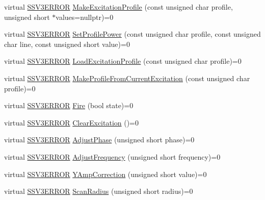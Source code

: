 \begin{DoxyCompactItemize}
\item 
virtual \hyperlink{classSSV3_1_1Controller_a8ff24a92ec373aa1257dcfe2aa2e5406}{S\-S\-V3\-E\-R\-R\-O\-R} \hyperlink{classSSV3_1_1Controller_ab487017fe12dd264eb13ed5a22ea5234}{Make\-Excitation\-Profile} (const unsigned char profile, unsigned short $\ast$values=nullptr)=0
\item 
virtual \hyperlink{classSSV3_1_1Controller_a8ff24a92ec373aa1257dcfe2aa2e5406}{S\-S\-V3\-E\-R\-R\-O\-R} \hyperlink{classSSV3_1_1Controller_a86dec212a202c8fae4eed2ab5251075d}{Set\-Profile\-Power} (const unsigned char profile, const unsigned char line, const unsigned short value)=0
\item 
virtual \hyperlink{classSSV3_1_1Controller_a8ff24a92ec373aa1257dcfe2aa2e5406}{S\-S\-V3\-E\-R\-R\-O\-R} \hyperlink{classSSV3_1_1Controller_a556fcce5eaf8e0858b5eb05d305ec2d8}{Load\-Excitation\-Profile} (const unsigned char profile)=0
\item 
virtual \hyperlink{classSSV3_1_1Controller_a8ff24a92ec373aa1257dcfe2aa2e5406}{S\-S\-V3\-E\-R\-R\-O\-R} \hyperlink{classSSV3_1_1Controller_a9de63a8ca846a49c3a7d4e988f887d73}{Make\-Profile\-From\-Current\-Excitation} (const unsigned char profile)=0
\item 
virtual \hyperlink{classSSV3_1_1Controller_a8ff24a92ec373aa1257dcfe2aa2e5406}{S\-S\-V3\-E\-R\-R\-O\-R} \hyperlink{classSSV3_1_1Controller_a2e5dde8cc685bede99147a25bc8f70a8}{Fire} (bool state)=0
\item 
virtual \hyperlink{classSSV3_1_1Controller_a8ff24a92ec373aa1257dcfe2aa2e5406}{S\-S\-V3\-E\-R\-R\-O\-R} \hyperlink{classSSV3_1_1Controller_aeb92ffd0489932c59f7cf8454b9141b2}{Clear\-Excitation} ()=0
\item 
virtual \hyperlink{classSSV3_1_1Controller_a8ff24a92ec373aa1257dcfe2aa2e5406}{S\-S\-V3\-E\-R\-R\-O\-R} \hyperlink{classSSV3_1_1Controller_a467ae341e71de80ab18bb5c0a8ed8f4f}{Adjust\-Phase} (unsigned short phase)=0
\item 
virtual \hyperlink{classSSV3_1_1Controller_a8ff24a92ec373aa1257dcfe2aa2e5406}{S\-S\-V3\-E\-R\-R\-O\-R} \hyperlink{classSSV3_1_1Controller_a752ede3242af22ba7ccc1a332c65f195}{Adjust\-Frequency} (unsigned short frequency)=0
\item 
virtual \hyperlink{classSSV3_1_1Controller_a8ff24a92ec373aa1257dcfe2aa2e5406}{S\-S\-V3\-E\-R\-R\-O\-R} \hyperlink{classSSV3_1_1Controller_af3db85c32975f6756e03bb2d8a21ca45}{Y\-Amp\-Correction} (unsigned short value)=0
\item 
virtual \hyperlink{classSSV3_1_1Controller_a8ff24a92ec373aa1257dcfe2aa2e5406}{S\-S\-V3\-E\-R\-R\-O\-R} \hyperlink{classSSV3_1_1Controller_a9b01383dc0fde626988c9c08e10bd537}{Scan\-Radius} (unsigned short radius)=0

\end{DoxyCompactItemize}
